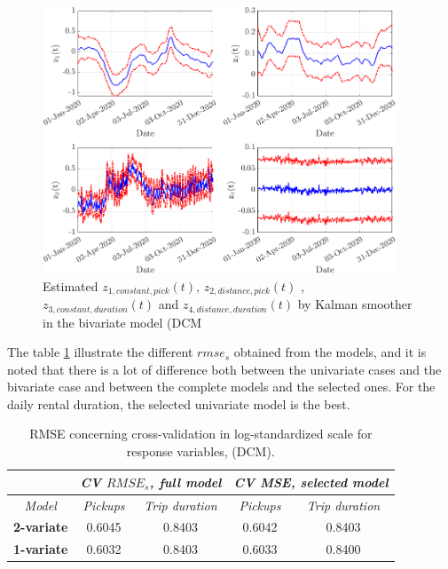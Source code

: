 \begin{figure}[h!]
	\centering
	\includegraphics[height=300px]{Images/Data analysis/DCM/trend_z_bivariate_selected_DCM.png}
	\caption[Estimated $z_{1,constant,pick}(t)$,  $z_{2,distance,pick}(t)$ , $z_{3,constant,duration}(t)$ and $z_{4,distance,duration}(t)$ by Kalman smoother in the bivariate model (DCM)]{Estimated $z_{1,constant,pick}(t)$,  $z_{2,distance,pick}(t)$ , $z_{3,constant,duration}(t)$ and $z_{4,distance,duration}(t)$ by Kalman smoother in the bivariate model (DCM}
	\label{Trend_zeta_latente_biv}
\end{figure}
\noindent

The table \ref{Cross-validation rmse_s DCM} illustrate the different $rmse_{s}$ obtained from the models, and it is noted that there is a lot of difference both between the univariate cases and the bivariate case and between the complete models and the selected ones. For the daily rental duration, the selected univariate model is the best.

\begin{table}[h!]
	\centering
	\renewcommand\arraystretch{1.3}
	\begin{tabular}{c|cc|cc}
		\hline
		\multicolumn{1}{l|}{} & \multicolumn{2}{c|}{\textit{CV $RMSE_{s}$, full model}} & \multicolumn{2}{c}{\textit{CV MSE, selected model} }\\ 
		\hline
		\textit{Model} & \multicolumn{1}{c|}{\textit{Pickups}} & \textit{Trip duration} & \multicolumn{1}{c|}{\textit{Pickups}} & \textit{Trip duration} \\ 
		\hline
		\textbf{2-variate } & \multicolumn{1}{c|}{0.6045}  & 0.8403   & \multicolumn{1}{c|}{0.6042}  & 0.8403   \\ 
		\hline
		\textbf{1-variate } & \multicolumn{1}{c|}{0.6032}  & 0.8403   & \multicolumn{1}{c|}{0.6033}  & 0.8400   \\ 
		\hline
	\end{tabular}
	\caption[RMSE concerning cross-validation in log-standardized scale for response variables, (DCM))]{RMSE concerning cross-validation in log-standardized scale for response variables, (DCM).}
	\label{Cross-validation rmse_s DCM}
\end{table}